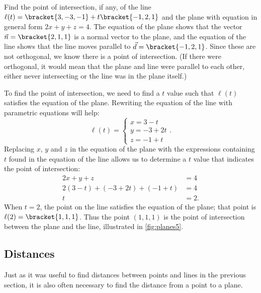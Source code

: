 \begin{example}\label{ex_planes5}%
Find the point of intersection, if any, of the line $\ell(t) =\bracket{3,-3,-1}+t\bracket{-1,2,1}$ and the plane with equation in general form $2x+y+z=4$.
\solution
The equation of the plane shows that the vector $\vec n =\bracket{2,1,1}$ is a normal vector to the plane, and the equation of the line shows that the line moves parallel to $\vec d =\bracket{-1,2,1}$. Since these are not orthogonal, we know there is a point of intersection. (If there were orthogonal, it would mean that the plane and line were parallel to each other, either never intersecting or the line was in the plane itself.)

To find the point of intersection, we need to find a $t$ value such that $\ell(t)$ satisfies the equation of the plane. Rewriting the equation of the line with parametric equations will help:
\[\ell(t) = \begin{cases}x=3-t\\y=-3+2t\\z=-1+t\end{cases}.\]%
%
Replacing $x$, $y$ and $z$ in the equation of the plane with the expressions containing $t$ found in the equation of the line allows us to determine a $t$ value that indicates the point of intersection:
\begin{align*}
2x+y+z &=4 \\
2(3-t) + (-3+2t) + (-1+t) &= 4 \\
t&=2.
\end{align*}
When $t=2$, the point on the line satisfies the equation of the plane; that point is $\ell(2) =\bracket{1,1,1}$. Thus the point $(1,1,1)$ is the point of intersection between the plane and the line, illustrated in \autoref{fig:planes5}.
\end{example}

\subsection{Distances}

Just as it was useful to find distances between points and lines in the previous section, it is also often necessary to find the distance from a point to a plane.

